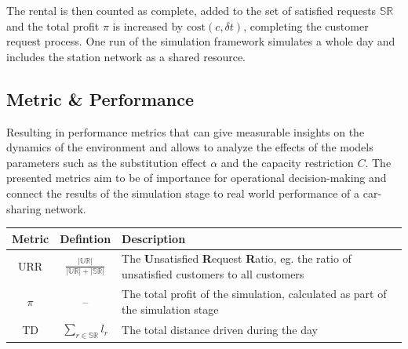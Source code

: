 The rental is then counted as complete, added to the set of satisfied requests $\mathbb{SR}$ and the total profit $\pi$ is increased by $\text{cost}(c, \delta t)$, completing the
customer request process. One run of the simulation framework simulates a whole day and includes the station network
as a shared resource.


\subsection{Metric \& Performance}
\label{sub_sec:Method/Metrics}

Resulting in performance metrics that can give measurable insights on the dynamics of the environment and
allows to analyze the effects of the models parameters such as the substitution effect $\alpha$ and the
capacity restriction $C$. The presented metrics aim to be of importance for operational decision-making
and connect the results of the simulation stage to real world performance of a car-sharing network.

\vspace*{4ex}
\renewcommand\tabularxcolumn[1]{m{#1}}
\renewcommand{\arraystretch}{1.6}
\begin{center}
\centering
\begin{tabularx}{0.9\linewidth}{@{}c|c|X@{}}
  \textbf{Metric} & \textbf{Defintion} & \textbf{Description} \\
  \hline
  URR & $\frac{|\mathbb{UR}|}{|\mathbb{UR}| + |\mathbb{SR}|}$ & The \textbf{U}nsatisfied \textbf{R}equest \textbf{R}atio, eg. the ratio of unsatisfied customers to all customers \\
  $\pi$ & {--} & The total profit of the simulation, calculated as part of the simulation stage \\
  TD & $\sum_{r \in \mathbb{SR}} l_r$ & The total distance driven during the day \\
\end{tabularx}
\end{center}

\renewcommand{\arraystretch}{1}

